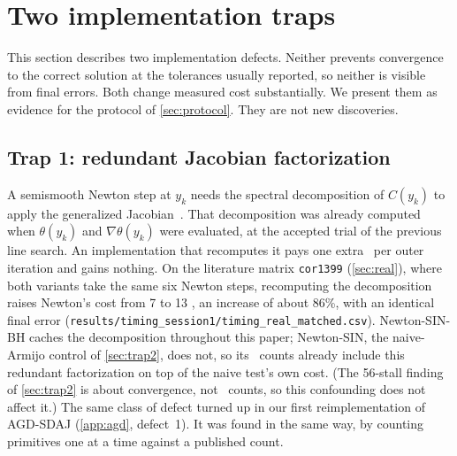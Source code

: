 \section{Two implementation traps}\label{sec:traps}

This section describes two implementation defects. Neither prevents
convergence to the correct solution at the tolerances usually reported, so
neither is visible from final errors. Both change measured cost substantially.
We present them as evidence for the protocol of \cref{sec:protocol}. They are
not new discoveries.

\subsection{Trap 1: redundant Jacobian factorization}\label{sec:trap1}
A semismooth Newton step at $y_k$ needs the spectral decomposition of
$C(y_k)$ to apply the generalized Jacobian~\cite{qisun2006quadratically}. That
decomposition was already computed when $\theta(y_k)$ and $\nabla\theta(y_k)$
were evaluated, at the accepted trial of the previous line search. An
implementation that recomputes it pays one extra \EVD\ per outer iteration and
gains nothing. On the literature matrix \texttt{cor1399} (\cref{sec:real}),
where both variants take the same six Newton steps, recomputing the
decomposition raises Newton's cost from 7 to 13 \EVDs, an increase of about
86\%, with an identical final error
(\texttt{results/timing\_session1/timing\_real\_matched.csv}). Newton-SIN-BH caches the decomposition throughout
this paper; Newton-SIN, the naive-Armijo control of \cref{sec:trap2}, does
not, so its \EVD\ counts already include this redundant factorization on top
of the naive test's own cost. (The 56-stall finding of \cref{sec:trap2} is
about convergence, not \EVD\ counts, so this confounding does not affect it.)
The same class of defect turned up in our first
reimplementation of AGD-SDAJ (\cref{app:agd}, defect~1). It was found in the
same way, by
counting primitives one at a time against a published count.

